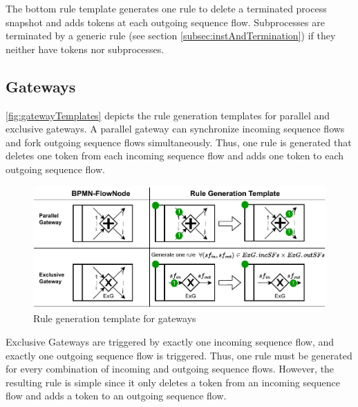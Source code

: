 \documentclass[submission, copyright, creativecommons]{eptcs}
\begin{document}
The bottom rule template generates one rule to delete a terminated process snapshot and adds tokens at each outgoing sequence flow.
Subprocesses are terminated by a generic rule (see section \ref{subsec:instAndTermination}) if they neither have tokens nor subprocesses.


\subsection{Gateways}
\autoref{fig:gatewayTemplates} depicts the rule generation templates for parallel and exclusive gateways.
A parallel gateway can synchronize incoming sequence flows and fork outgoing sequence flows simultaneously.
Thus, one rule is generated that deletes one token from each incoming sequence flow and adds one token to each outgoing sequence flow.

\begin{figure}[h]
    \centering
    \includegraphics[width=1\textwidth]{images/gateways_template.pdf}
    \caption{Rule generation template for gateways}
    \label{fig:gatewayTemplates}
\end{figure}

Exclusive Gateways are triggered by exactly one incoming sequence flow, and exactly one outgoing sequence flow is triggered.
Thus, one rule must be generated for every combination of incoming and outgoing sequence flows.
However, the resulting rule is simple since it only deletes a token from an incoming sequence flow and adds a token to an outgoing sequence flow.

\end{document}
